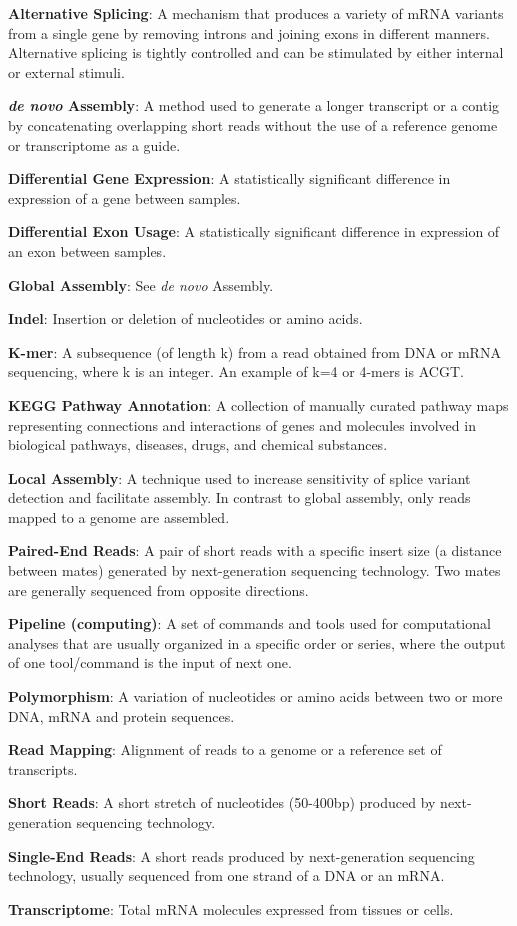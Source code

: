 \noindent
\textbf{Alternative Splicing}: A mechanism that produces a
variety of mRNA variants from a single gene by removing introns
and joining exons in different manners. Alternative splicing is
tightly controlled and can be stimulated by either internal or
external stimuli.

\noindent
\textbf{{\em de novo} Assembly}: A method used to generate a
longer transcript or a contig by concatenating overlapping short
reads without the use of a reference genome or transcriptome as a
guide.

\noindent
\textbf{Differential Gene Expression}: A statistically significant
difference in expression of a gene between samples.

\noindent
\textbf{Differential Exon Usage}: A statistically significant
difference in expression of an exon between samples.

\noindent
\textbf{Global Assembly}: See {\em de novo} Assembly.

\noindent
\textbf{Indel}: Insertion or deletion of nucleotides or amino
acids.

\noindent
\textbf{K-mer}: A subsequence (of length k) from a read obtained
from DNA or mRNA sequencing, where k is an integer.  An example
of k=4 or 4-mers is ACGT. 

\noindent
\textbf{KEGG Pathway Annotation}: A collection of manually
curated pathway maps representing connections and interactions of
genes and molecules involved in biological pathways, diseases,
drugs, and chemical substances.

\noindent
\textbf{Local Assembly}: A technique used to increase sensitivity of
splice variant detection and facilitate assembly. In contrast to
global assembly, only reads mapped to a genome are assembled.

\noindent
\textbf{Paired-End Reads}: A pair of short reads with a specific
insert size (a distance between mates) generated by next-generation
sequencing technology. Two mates are generally sequenced from
opposite directions.

\noindent
\textbf{Pipeline (computing)}: A set of commands and tools used
for computational analyses that are usually organized in a
specific order or series, where the output of one tool/command is the
input of next one.

\noindent
\textbf{Polymorphism}: A variation of nucleotides or amino acids
between two or more DNA, mRNA and protein sequences.

\noindent
\textbf{Read Mapping}: Alignment of reads to a genome or a reference
set of transcripts.

\noindent
\textbf{Short Reads}: A short stretch of nucleotides (50-400bp)
produced by next-generation sequencing technology.

\noindent
\textbf{Single-End Reads}: A short reads produced by next-generation
sequencing technology, usually sequenced from one strand of a DNA
or an mRNA.

\noindent
\textbf{Transcriptome}: Total mRNA molecules expressed from
tissues or cells.
